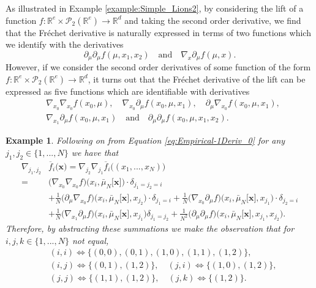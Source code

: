 \documentclass[a4paper,11pt,twoside]{article}
\numberwithin{equation}{section}
\theoremstyle{plain}
\newtheorem{example}[theorem]{Example}
\newcommand{\bR}{\mathbb{R}}
\newcommand{\cP}{\mathcal{P}}
\newcommand{\1}{\mathbbm{1}}
\begin{document}
	As illustrated in Example \ref{example:Simple_Lions2}, by considering the lift of a function $f:\bR^e \times \cP_2(\bR^e) \to \bR^d$ and taking the second order derivative, we find that the Fr\'echet derivative is naturally expressed in terms of two functions which we identify with the derivatives
	$$
	\partial_{\mu} \partial_{\mu} f (\mu, x_1, x_2)
	\quad \mbox{and} \quad
	\nabla_x \partial_{\mu} f( \mu, x). 
	$$
	However, if we consider the second order derivatives of some function of the form $f: \bR^e \times \cP_2(\bR^e) \to \bR^d$, it turns out that the Fr\'echet derivative of the lift can be expressed as five functions which are identifiable with derivatives
	\begin{align*}
		&\nabla_{x_0} \nabla_{x_0} f(x_0, \mu), 
		\quad
		\nabla_{x_0} \partial_\mu f(x_0, \mu, x_1), 
		\quad
		\partial_{\mu} \nabla_{x_0} f(x_0, \mu, x_1), 
		\\
		&\nabla_{x_1} \partial_{\mu} f(x_0, \mu, x_1)
		\quad \mbox{and} \quad
		\partial_{\mu} \partial_{\mu} f(x_0, \mu, x_1, x_2). 
	\end{align*}
	
	\begin{example}
		\label{example:Simple_Lions4}
		Following on from Equation \eqref{eq:Empirical-1Deriv_0} for any $j_1, j_2 \in \{1, ..., N\}$ we have that 
		\begin{align}
			\nonumber
			\nabla_{j_1,j_2}& \overline{f}_i\Big( \boldsymbol{x} \Big)
			=
			\nabla_{j_2} \nabla_{j_1} \overline{f}_i\Big( (x_1, ..., x_N) \Big)
			\\
			\nonumber
			=& \big(\nabla_{x_0} \nabla_{x_0} f\big)\Big( x_i, \bar{\mu}_N\big[\boldsymbol{x} \big] \Big) \cdot \delta_{j_1 = j_2 = i}
			\\
			\nonumber
			&+ \tfrac{1}{N} \big(\partial_{\mu} \nabla_{x_0} f \big)\Big( x_i, \bar{\mu}_N\big[ \boldsymbol{x} \big], x_{j_2} \Big) \cdot \delta_{j_1 = i} +  \tfrac{1}{N} \big(\nabla_{x_0} \partial_{\mu}  f \big)\Big( x_i, \bar{\mu}_N\big[ \boldsymbol{x} \big], x_{j_1} \Big) \cdot \delta_{j_2 = i} 
			\\
			\label{eq:example:Simple_Lions4}
			&+ \tfrac{1}{N} \big(\nabla_{x_1} \partial_\mu f \big)\Big( x_i, \bar{\mu}_N\big[ \boldsymbol{x} \big], x_{j_1} \Big) \delta_{j_1 = j_2} + \tfrac{1}{N^2} \big(\partial_\mu \partial_\mu f\big) \Big( x_i, \bar{\mu}_N\big[ \boldsymbol{x} \big], x_{j_1}, x_{j_2} \Big). 
		\end{align}
		Therefore, by abstracting these summations we make the observation that for $i, j, k \in \{1, ..., N\}$ not equal, 
		\begin{align*}
			&(i, i) \iff \Big\{ (0,0), (0,1), (1, 0), (1,1), (1, 2) \Big\},
			\\
			&(i, j) \iff \Big\{ (0,1), (1,2) \Big\},
			\quad
			(j, i) \iff \Big\{ (1, 0), (1,2) \Big\},
			\\
			&(j, j) \iff \Big\{ (1,1), (1,2) \Big\},
			\quad
			(j, k) \iff \Big\{ (1,2) \Big\}. 
		\end{align*}
	\end{example}
	
\end{document}

